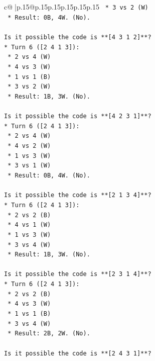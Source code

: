 \documentclass{article}
\begin{document}
{\begin{supertabular}{c@{$\;$}|p{.15\linewidth}@{}p{.15\linewidth}p{.15\linewidth}p{.15\linewidth}p{.15\linewidth}p{.15\linewidth}}
{{{\texttt{    *   3 vs 2 (W)} \\
\texttt{    *   Result: 0B, 4W. (No).} \\
\\ 
\texttt{Is it possible the code is **{[}4 3 1 2{]}**?} \\
\texttt{*   Turn 6 ({[}2 4 1 3{]}):} \\
\texttt{    *   2 vs 4 (W)} \\
\texttt{    *   4 vs 3 (W)} \\
\texttt{    *   1 vs 1 (B)} \\
\texttt{    *   3 vs 2 (W)} \\
\texttt{    *   Result: 1B, 3W. (No).} \\
\\ 
\texttt{Is it possible the code is **{[}4 2 3 1{]}**?} \\
\texttt{*   Turn 6 ({[}2 4 1 3{]}):} \\
\texttt{    *   2 vs 4 (W)} \\
\texttt{    *   4 vs 2 (W)} \\
\texttt{    *   1 vs 3 (W)} \\
\texttt{    *   3 vs 1 (W)} \\
\texttt{    *   Result: 0B, 4W. (No).} \\
\\ 
\texttt{Is it possible the code is **{[}2 1 3 4{]}**?} \\
\texttt{*   Turn 6 ({[}2 4 1 3{]}):} \\
\texttt{    *   2 vs 2 (B)} \\
\texttt{    *   4 vs 1 (W)} \\
\texttt{    *   1 vs 3 (W)} \\
\texttt{    *   3 vs 4 (W)} \\
\texttt{    *   Result: 1B, 3W. (No).} \\
\\ 
\texttt{Is it possible the code is **{[}2 3 1 4{]}**?} \\
\texttt{*   Turn 6 ({[}2 4 1 3{]}):} \\
\texttt{    *   2 vs 2 (B)} \\
\texttt{    *   4 vs 3 (W)} \\
\texttt{    *   1 vs 1 (B)} \\
\texttt{    *   3 vs 4 (W)} \\
\texttt{    *   Result: 2B, 2W. (No).} \\
\\ 
\texttt{Is it possible the code is **{[}2 4 3 1{]}**?} \\
}}}
\end{supertabular}}
\end{document}
